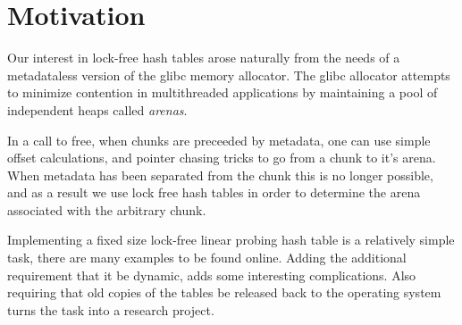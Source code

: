 \section{Motivation}
\label{sec:intro}

Our interest in lock-free hash tables arose naturally from the needs
of a metadataless version of the glibc memory allocator.  The glibc
allocator attempts to minimize contention in multithreaded
applications by maintaining a pool of independent heaps called \emph{arenas}.

In a call to free, when chunks are preceeded by metadata, one can use
simple offset calculations, and pointer chasing tricks to go from a
chunk to it's arena. When metadata has been separated from the chunk
this is no longer possible, and as a result we use lock free hash
tables in order to determine the arena associated with the arbitrary
chunk.


Implementing a fixed size lock-free linear probing hash table is a
relatively simple task, there are many examples to be found online.
Adding the additional requirement that it be dynamic, adds some
interesting complications. Also requiring that old copies of the
tables be released back to the operating system turns the task into a
research project.

